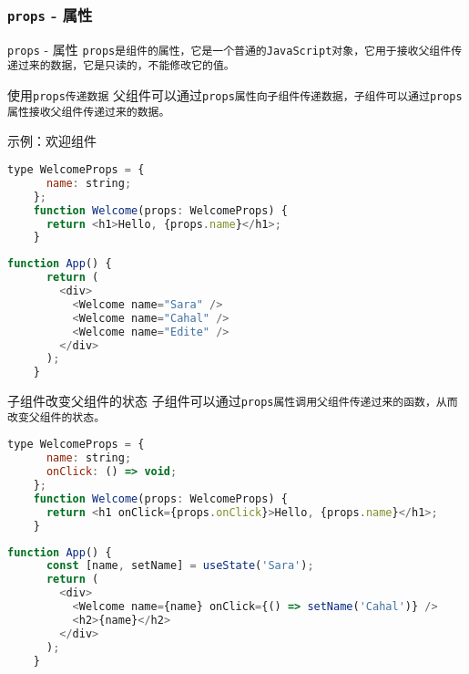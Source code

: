 \documentclass{beamer}
\begin{document}
\begin{frame}
  \frametitle{\texttt{props} - 属性}

  \begin{block}{\texttt{props} - 属性}
    \tt{props}是组件的属性，它是一个普通的\tt{JavaScript}对象，它用于接收父组件传递过来的数据，它是只读的，不能修改它的值。
  \end{block}

  \begin{block}{使用\tt{props}传递数据}
    父组件可以通过\tt{props}属性向子组件传递数据，子组件可以通过\tt{props}属性接收父组件传递过来的数据。
  \end{block}

  \framebreak

  示例：欢迎组件

  \begin{lstlisting}[language=JavaScript]
    type WelcomeProps = {
      name: string;
    };
    function Welcome(props: WelcomeProps) {
      return <h1>Hello, {props.name}</h1>;
    }
\end{lstlisting}

  \begin{lstlisting}[language=JavaScript]
    function App() {
      return (
        <div>
          <Welcome name="Sara" />
          <Welcome name="Cahal" />
          <Welcome name="Edite" />
        </div>
      );
    }
\end{lstlisting}

  \framebreak

  \begin{block}{子组件改变父组件的状态}
    子组件可以通过\tt{props}属性调用父组件传递过来的函数，从而改变父组件的状态。

  \end{block}

  \begin{lstlisting}[language=JavaScript]
    type WelcomeProps = {
      name: string;
      onClick: () => void;
    };
    function Welcome(props: WelcomeProps) {
      return <h1 onClick={props.onClick}>Hello, {props.name}</h1>;
    }
\end{lstlisting}

  \begin{lstlisting}[language=JavaScript]
    function App() {
      const [name, setName] = useState('Sara');
      return (
        <div>
          <Welcome name={name} onClick={() => setName('Cahal')} />
          <h2>{name}</h2>
        </div>
      );
    }
\end{lstlisting}


\end{frame}
\end{document}
